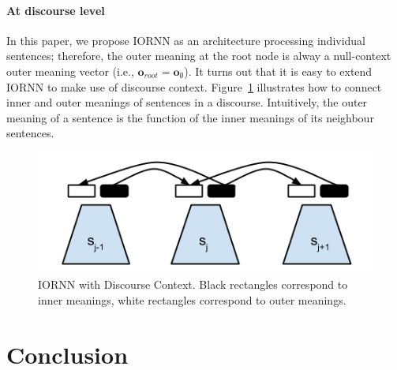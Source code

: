 \documentclass[11pt]{article}
\begin{document}
\paragraph{At discourse level} In this paper, we propose IORNN as an architecture 
processing individual sentences; therefore, the outer meaning at the root node is alway a 
null-context outer meaning vector (i.e., $\mathbf{o}_{root} = \mathbf{o}_{\emptyset}$).
It turns out that it is easy to extend IORNN to make use of discourse context.
Figure~\ref{figure dciornn} illustrates how to connect inner and outer meanings 
of sentences in a discourse. Intuitively, the outer meaning of a sentence is 
the function of the inner meanings of its neighbour sentences. 

\begin{figure}[h!]
	\center
	\includegraphics[scale=0.5]{DC-IO-RNN.png}
	\caption{IORNN with Discourse Context. 
	Black rectangles correspond to inner meanings, 
	white rectangles correspond to outer meanings.}
	\label{figure dciornn}
\end{figure}



\section{Conclusion}
\label{section conclusion}




\end{document}
